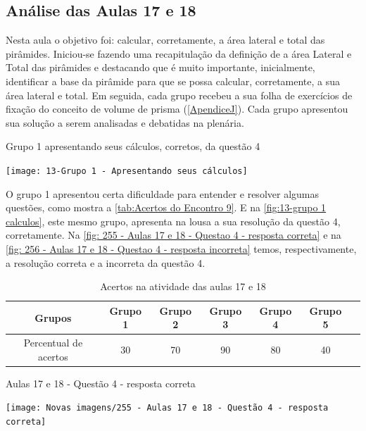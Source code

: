 \subsection{Análise das Aulas 17 e 18}

Nesta aula o objetivo foi: calcular, corretamente, a área lateral e total das pirâmides. Iniciou-se fazendo uma recapitulação da definição de a área Lateral e Total das pirâmides e destacando que é muito importante, inicialmente, identificar a base da pirâmide para que se possa calcular, corretamente, a sua área lateral e total. Em seguida, cada grupo recebeu a sua folha de exercícios de fixação do conceito de volume de prisma (\autoref{ApendiceJ}). Cada grupo apresentou sua solução a serem analisadas e debatidas na plenária.

\begin{CenteredFigure}
    \caption{Grupo 1 apresentando seus cálculos, corretos, da questão 4} \label{fig:13-grupo 1 calculos}
    \texttt{[image: 13-Grupo 1 - Apresentando seus cálculos]}
    \legend{\autoria}
\end{CenteredFigure}

O grupo 1 apresentou certa dificuldade para entender e resolver algumas questões, como mostra a \autoref{tab:Acertos do Encontro 9}. E na \autoref{fig:13-grupo 1 calculos}, este mesmo grupo, apresenta na lousa a sua resolução da questão 4, corretamente. Na \autoref{fig: 255 - Aulas 17 e 18 - Questao 4 - resposta correta} e na \autoref{fig: 256 - Aulas 17 e 18 - Questao 4 - resposta incorreta} temos, respectivamente, a resolução correta e a incorreta da questão 4.

\begin{table}[htbp] \centering
    \caption{Acertos na atividade das aulas 17 e 18} \label{tab:Acertos do Encontro 9}
    \begin{tabular}{|c|c|c|c|c|c|c|}
        \hline
        \textbf{Grupos}       & \textbf{Grupo 1} & \textbf{Grupo 2} & \textbf{Grupo 3} & \textbf{Grupo 4} & \textbf{Grupo 5} \\
        \hline
        Percentual de acertos & 30               & 70               & 90               & 80               & 40               \\
        \hline
    \end{tabular}
    \legend{\legendaTabela}
\end{table}

\begin{CenteredFigure}
    \caption{Aulas 17 e 18 - Questão 4 - resposta correta} \label{fig: 255 - Aulas 17 e 18 - Questao 4 - resposta correta}
    \texttt{[image: Novas imagens/255 - Aulas 17 e 18 - Questão 4 - resposta correta]}
    \legend{\autoria}
\end{CenteredFigure}

